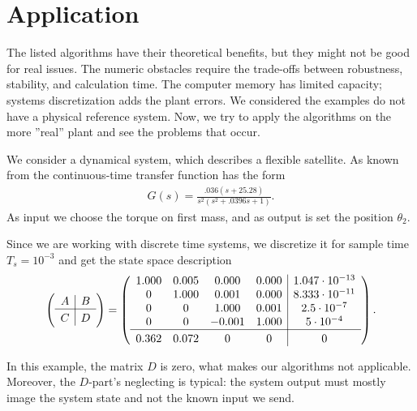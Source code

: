 \chapter{Application}
\label{ch:Allpication}

The listed algorithms have their theoretical benefits, but they might not be good for real issues. The numeric obstacles require the trade-offs between robustness, stability, and calculation time. The computer memory has limited capacity; systems discretization adds the plant errors. We considered the examples do not have a physical reference system. Now, we try to apply the algorithms on the more ''real'' plant and see the problems that occur. 



	\begin{exam}
		 We consider a dynamical system, which describes a flexible satellite. As known from \cite{SchRC} the continuous-time transfer function has the form  
		\begin{align}
		G(s) = \frac{.036(s + 25.28)}{s^2(s^2 + .0396s + 1)}. 
		\end{align}
		As input we choose the torque on first mass, and as output is set the position $\theta_2$. 
		
		Since we are working with discrete time systems, we discretize it for sample time $T_s = 10^{-3}$  and get the state space description 
		\begin{align}
		\label{eq:Appl:satellite_sys}
		\left( \begin{array}{c | c}
		A & B \\ \hline C & D
		\end{array}\right) = 
		\left(\begin{array}{c c c c | c}
	    1.000  &  0.005  &  0.000  &  0.000 & 1.047\cdot 10^{-13}\\
		0  &  1.000  &  0.001  &  0.000 & 8.333\cdot 10^{-11}\\
		0  &       0  &  1.000  &  0.001 & 2.5\cdot 10^{-7}\\
		0  &       0  & -0.001  &  1.000 & 5\cdot 10^{-4}\\ \hline
        0.362 & 0.072&  0 & 0 & 0
		\end{array}\right). 
	\end{align}
	\end{exam}

In this example, the matrix $D$ is zero, what makes our algorithms not applicable. 
Moreover, the  $D$-part's neglecting is typical: the system output must mostly image the system state and not the known input we send. 

